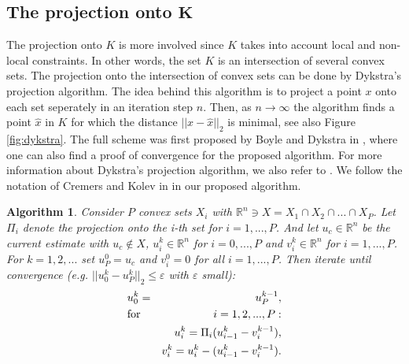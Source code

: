 \documentclass[abstracton]{scrreprt}
\newtheorem{algorithm}[theorem]{Algorithm}
\begin{document}
        \subsection{The projection onto $\boldsymbol{K}$} %
        \label{sub:the_projection_onto_K}
            The projection onto $K$ is more involved since $K$ takes into account local and non-local constraints. In other words, the set $K$ is an intersection of several convex sets. The projection onto the intersection of convex sets can be done by Dykstra's projection algorithm. The idea behind this algorithm is to project a point $x$ onto each set seperately in an iteration step $n$. Then, as $n \to \infty$ the algorithm finds a point $\hat{x}$ in $K$ for which the distance $||x - \hat{x}||_{2}$ is minimal, see also Figure \ref{fig:dykstra}. The full scheme was first proposed by Boyle and Dykstra in \cite{dykstra-et-al-aors14}, where one can also find a proof of convergence for the proposed algorithm. For more information about Dykstra's projection algorithm, we also refer to \cite{dykstra-et-al-aors14}. We follow the notation of Cremers and Kolev in \cite{Cremers-Kolev-pami11} in our proposed algorithm.
            \begin{algorithm}
            \label{alg:dykstra}
                Consider $P$ convex sets $X_{i}$ with $\mathbb{R}^{n} \ni X = X_{1} \cap X_{2} \cap ... \cap X_{P}$. Let $\Pi_{i}$ denote the projection onto the i-th set for $i = 1, ..., P$. And let $u_{c} \in \mathbb{R}^{n}$ be the current estimate with $u_{c} \notin X$, $u_{i}^{k} \in \mathbb{R}^{n}$ for $i = 0, ..., P$ and $v_{i}^{k} \in \mathbb{R}^{n}$ for $i = 1, ..., P$. For $k = 1, 2, ...$ set $u^{0}_{P} = u_{c}$ and $v^{0}_{i} = 0$ for all $i = 1, ..., P$. Then iterate until convergence (e.g. $||u_{0}^{k} - u_{P}^{k}||_{2} \le \varepsilon$ with $\varepsilon$ small):
                \begin{eqnarray}
                    &u_{0}^{k} = &u_{P}^{k-1}, \notag \\
                    &\textnormal{for} \,\, &i = 1, 2, ..., P: \notag \\
                    &&u_{i}^{k} = \Pi_{i}(u_{i-1}^{k} - v_{i}^{k-1}), \notag \\
                    &&v_{i}^{k} = u_{i}^{k} - (u_{i-1}^{k} - v_{i}^{k-1}). \notag
                \end{eqnarray}
            \end{algorithm}
\end{document}
